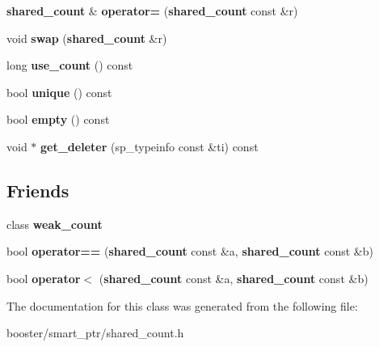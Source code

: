 \begin{DoxyCompactItemize}
\item 
{\bf shared\-\_\-count} \& {\bfseries operator=} ({\bf shared\-\_\-count} const \&r)\label{classbooster_1_1detail_1_1shared__count_ab0fcc7b8bf85f16f55f121b292bf0d23}

\item 
void {\bfseries swap} ({\bf shared\-\_\-count} \&r)\label{classbooster_1_1detail_1_1shared__count_af3626fdb2cfe76d0d6118064db95c2dd}

\item 
long {\bfseries use\-\_\-count} () const \label{classbooster_1_1detail_1_1shared__count_a43820697b7614ecaa0fea25a2ededd79}

\item 
bool {\bfseries unique} () const \label{classbooster_1_1detail_1_1shared__count_adf17c934b1bc1260c0ea7d04056cd7c4}

\item 
bool {\bfseries empty} () const \label{classbooster_1_1detail_1_1shared__count_a17fc5656ef9befe883837f8566124246}

\item 
void $\ast$ {\bfseries get\-\_\-deleter} (sp\-\_\-typeinfo const \&ti) const \label{classbooster_1_1detail_1_1shared__count_a92f2ed9d04dba29eb71e71ed5960cd8e}

\end{DoxyCompactItemize}
\subsection*{\-Friends}
\begin{DoxyCompactItemize}
\item 
class {\bfseries weak\-\_\-count}\label{classbooster_1_1detail_1_1shared__count_a52546549a7fd30c6519bbed0aa62423a}

\item 
bool {\bfseries operator==} ({\bf shared\-\_\-count} const \&a, {\bf shared\-\_\-count} const \&b)\label{classbooster_1_1detail_1_1shared__count_aef780234c6f1b295c4cd4bc78268081a}

\item 
bool {\bfseries operator$<$} ({\bf shared\-\_\-count} const \&a, {\bf shared\-\_\-count} const \&b)\label{classbooster_1_1detail_1_1shared__count_afb9b6fff363ab72cfaa7f3af7518c21b}

\end{DoxyCompactItemize}


\-The documentation for this class was generated from the following file\-:\begin{DoxyCompactItemize}
\item 
booster/smart\-\_\-ptr/shared\-\_\-count.\-h\end{DoxyCompactItemize}
